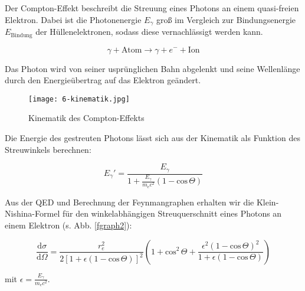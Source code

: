 Der Compton-Effekt beschreibt die Streuung eines Photons an einem quasi-freien Elektron. Dabei ist
die Photonenergie $E_\gamma$ groß im Vergleich zur Bindungsenergie $E_{\text{Bindung}}$ der
Hüllenelektronen, sodass diese vernachlässigt werden kann.

\[ \gamma + \text{Atom} \longrightarrow \gamma + e^- +\text{Ion}\]

Das Photon wird von seiner usprünglichen Bahn abgelenkt und seine Wellenlänge durch den
Energieübertrag auf das Elektron geändert. 

\begin{figure}[H]
	\centering
	\texttt{[image: 6-kinematik.jpg]}
	\caption{Kinematik des Compton-Effekts	}
	\label{}
\end{figure}

Die Energie des gestreuten Photons lässt sich aus der Kinematik als Funktion des Streuwinkels
berechnen:

\[ E_\gamma' = \frac{E_\gamma}{1+ \frac{E_\gamma}{m_ec^2}\left(1-\text{cos}\,\Theta\right)} \]

Aus der QED und Berechnung der Feynmangraphen erhalten wir die Klein-Nishina-Formel für den
winkelabhängigen Streuquerschnitt eines Photons an einem Elektron (s. Abb. \ref{fgraph2}):

\[ \frac{\mathrm{d}\sigma}{\mathrm{d}\Omega} = \frac{r_e^2}{2
\left[1+\epsilon\left(1-\text{cos}\,\Theta \right) \right]^2} \left(1+\text{cos}^2\,\Theta +
\frac{\epsilon^2\left(1-\text{cos}\,\Theta \right)^2}{1+\epsilon\left(1- \text{cos}\,\Theta \right)}
\right)
\]

mit $\epsilon = \frac{E_\gamma}{m_ec^2}$.

\begin{figure}[H]
	\begin{minipage}[b]{0.5\textwidth}
		\begin{figure}[H]
		\centering
		
		\end{figure}
	\end{minipage}
	\hspace{5mm} 
	\begin{minipage}[b]{0.5\textwidth}
		\begin{figure}[H]
		\centering
		
		\vspace{3mm}
		\end{figure} 
	\end{minipage} 
\end{figure}


